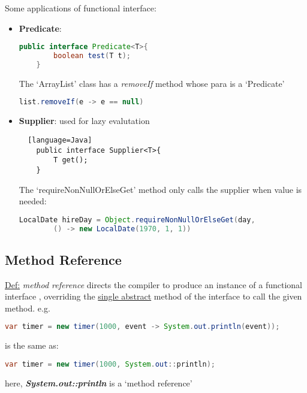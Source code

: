 \documentclass[12pt]{article}
\begin{document}
Some applications of functional interface:
\begin{itemize}
    \item \textbf{Predicate}:
    \begin{lstlisting}[language=Java]
    public interface Predicate<T>{
        boolean test(T t);
    }
    \end{lstlisting}
    The `ArrayList' class has a \emph{removeIf} method whose para is a `Predicate'
    \begin{lstlisting}[language=Java]
    list.removeIf(e -> e == null)
    \end{lstlisting}
    \item \textbf{Supplier}: used for lazy evalutation
    \begin{lstlisting}  [language=Java]
    public interface Supplier<T>{
        T get();
    }
    \end{lstlisting}
    The `requireNonNullOrElseGet' method only calls the supplier when value is needed:
    \begin{lstlisting}[language=Java]
    LocalDate hireDay = Object.requireNonNullOrElseGet(day,
        () -> new LocalDate(1970, 1, 1))
    \end{lstlisting}
\end{itemize}

\subsection{Method Reference}
\underline{Def:} \emph{method reference} directs the compiler to produce an instance of a functional interface
, overriding the \underline{single abstract} method of the interface to call the given method. \newline
e.g.
\begin{lstlisting}[language=Java]
var timer = new timer(1000, event -> System.out.println(event));
\end{lstlisting}
is the same as:
\begin{lstlisting}[language=Java]
var timer = new timer(1000, System.out::println);
\end{lstlisting}
here, \emph{\textbf{System.out::println}} is a `method reference'
\end{document}
